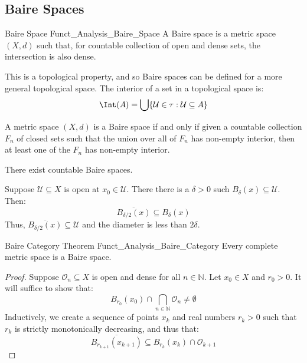 \documentclass[crop=false,class=book,oneside]{standalone}                      %
\begin{document}
        \subsection{Baire Spaces}
            \begin{ldefinition}{Baire Space}
                  {Funct_Analysis_Baire_Space}
            A Baire space is a metric space $(X,d)$ such that, for
            countable collection of open and dense sets, the
            intersection is also dense.
        \end{ldefinition}
            This is a topological property, and so Baire spaces can
            be defined for a more general topological space. The
            interior of a set in a topological space is:
            \begin{equation}
            \Int(A)=
            \bigcup\{\mathcal{U}\in\tau:\mathcal{U}\subseteq{A}\}
        \end{equation}
            \begin{theorem}
            A metric space $(X,d)$ is a Baire space if and only
            if given a countable collection $F_{n}$ of closed
            sets such that the union over all of $F_{n}$ has
            non-empty interior, then at least one of the $F_{n}$
            has non-empty interior.
            \end{theorem}
            \begin{theorem}
                There exist countable Baire spaces.
            \end{theorem}
            Suppose $\mathcal{U}\subseteq{X}$ is open at
            $x_{0}\in\mathcal{U}$. There there is a $\delta>0$ such
            $B_{\delta}(x)\subseteq\mathcal{U}$. Then:
            \begin{equation}
                \overline{B_{\delta/2}(x)}\subseteq{B}_{\delta}(x)
            \end{equation}
            Thus, $\overline{B_{\delta/2}(x)}\subseteq\mathcal{U}$
            and the diameter is less than $2\delta$.
            \begin{ltheorem}{Baire Category Theorem}
                  {Funct_Analysis_Baire_Category}
                Every complete metric space is a Baire space.
            \end{ltheorem}
            \begin{proof}
            Suppose $\mathcal{O}_{n}\subseteq{X}$ is open and
            dense for all $n\in\mathbb{N}$. Let $x_{0}\in{X}$ and
            $r_{0}>0$. It will suffice to show that:
            \begin{equation}
                B_{r_{0}}(x_{0})\cap\bigcap_{n\in\mathbb{N}}
                    \mathcal{O}_{n}\ne\emptyset
            \end{equation}
            Inductively, we create a sequence of points $x_{k}$
            and real numbers $r_{k}>0$ such that $r_{k}$ is strictly
            monotonically decreasing, and thus that:
            \begin{equation}
                \overline{B_{r_{k+1}}(x_{k+1})}
                \subseteq{B}_{r_{k}}(x_{k})\cap\mathcal{O}_{k+1}
            \end{equation}
        \end{proof}
\end{document}
